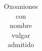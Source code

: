 \documentclass[12pt]{article}
\theoremstyle{mygreennumbox}
\begin{document}
\begin{enumerate}[label=\numberballblue]
          \begin{center}
              \begin{longtable}{@{}clcl@{}}
                  \caption{Oxoaniones con nombre vulgar admitido} \\

\end{longtable}
\end{center}
\end{enumerate}
\end{document}
